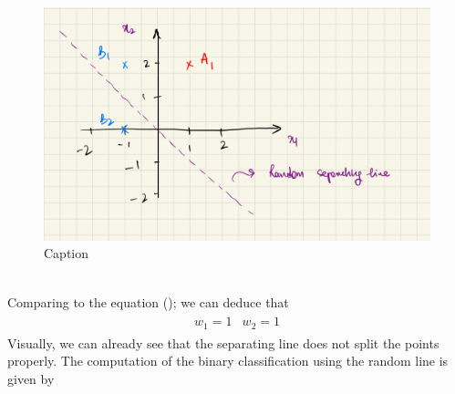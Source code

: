 \begin{figure}[!htbp]
  \centering
  \includegraphics[scale=0.15]{CHAPTER_2/c2_fig_perceptron_example_2.jpeg}
  \caption{Caption}
  \label{fig:perceptron_example_2}
\end{figure}\\
Comparing to the equation (); we can deduce that 
\begin{align}
  \begin{matrix}
    w_1 = 1 & w_2 = 1
  \end{matrix}
\end{align}
Visually, we can already see that the separating line does not split the points properly. The computation of the binary classification using the random line is given by
